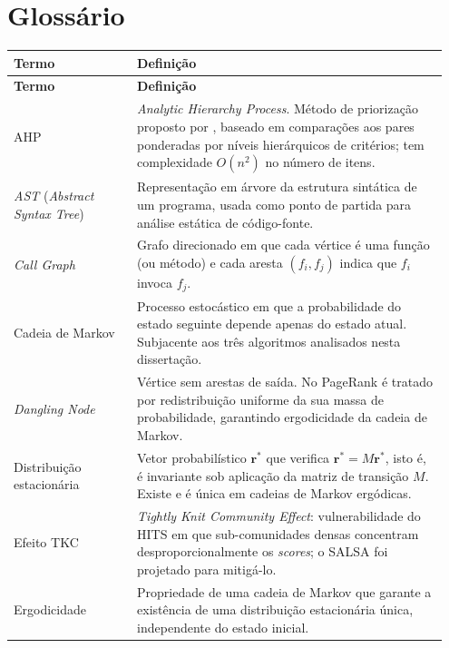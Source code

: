 \chapter{Glossário}
\label{ch:glossario}

\begin{longtable}{@{}p{0.27\linewidth} p{0.68\linewidth}@{}}
\toprule
\textbf{Termo} & \textbf{Definição} \\
\midrule
\endfirsthead
\toprule
\textbf{Termo} & \textbf{Definição} \\
\midrule
\endhead

AHP & \emph{Analytic Hierarchy Process}. Método de priorização
proposto por \citet{saaty1980}, baseado em comparações aos pares
ponderadas por níveis hierárquicos de critérios; tem complexidade
$O(n^2)$ no número de itens. \\

\emph{AST} (\emph{Abstract Syntax Tree}) & Representação em árvore
da estrutura sintática de um programa, usada como ponto de partida
para análise estática de código-fonte. \\

\emph{Call Graph} & Grafo direcionado em que cada vértice é uma
função (ou método) e cada aresta $(f_i, f_j)$ indica que $f_i$
invoca $f_j$. \\

Cadeia de Markov & Processo estocástico em que a probabilidade do
estado seguinte depende apenas do estado atual. Subjacente aos três
algoritmos analisados nesta dissertação. \\

\emph{Dangling Node} & Vértice sem arestas de saída. No PageRank é
tratado por redistribuição uniforme da sua massa de probabilidade,
garantindo ergodicidade da cadeia de Markov. \\

Distribuição estacionária & Vetor probabilístico $\mathbf{r}^{*}$
que verifica $\mathbf{r}^{*} = M\mathbf{r}^{*}$, isto é, é
invariante sob aplicação da matriz de transição $M$. Existe e é
única em cadeias de Markov ergódicas. \\

Efeito TKC & \emph{Tightly Knit Community Effect}: vulnerabilidade
do HITS em que sub-comunidades densas concentram
desproporcionalmente os \emph{scores}; o SALSA foi projetado para
mitigá-lo. \\

Ergodicidade & Propriedade de uma cadeia de Markov que garante a
existência de uma distribuição estacionária única, independente do
estado inicial. \\


\end{longtable}
